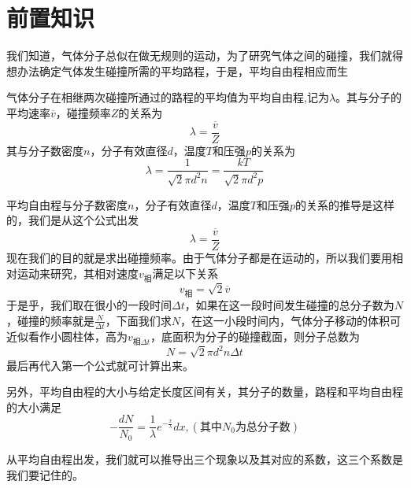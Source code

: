\documentclass[lang=cn,10pt]{elegantbook}
\begin{document}
	\section{前置知识}
	我们知道，气体分子总似在做无规则的运动，为了研究气体之间的碰撞，我们就得想办法确定气体发生碰撞所需的平均路程，于是，平均自由程相应而生
    \begin{definition}[平均自由程]
    	气体分子在相继两次碰撞所通过的路程的平均值为平均自由程,记为$\lambda$。其与分子的平均速率$\overline{v}$，碰撞频率$Z$的关系为
    	\begin{equation*}
    		\lambda=\frac{\overline{v}}{Z}
    	\end{equation*}
    	其与分子数密度$n$，分子有效直径$d$，温度$T$和压强$p$的关系为
    	\begin{equation*}
    		\lambda=\frac{1}{\sqrt{2}\pi d^{2}n}=\frac{kT}{\sqrt{2}\pi d^{2}p}
    	\end{equation*}
    \end{definition}
    \begin{note}
    	平均自由程与分子数密度$n$，分子有效直径$d$，温度$T$和压强$p$的关系的推导是这样的，我们是从这个公式出发
    	\begin{equation*}
    		\lambda=\frac{\overline{v}}{Z}
    	\end{equation*}
    	现在我们的目的就是求出碰撞频率。由于气体分子都是在运动的，所以我们要用相对运动来研究，其相对速度$v_{\text{相}}$满足以下关系
    	\begin{equation*}
    		v_{\text{相}}=\sqrt{2}\overline{v}
    	\end{equation*}
    	于是乎，我们取在很小的一段时间$\varDelta t$，如果在这一段时间发生碰撞的总分子数为$N$，碰撞的频率就是$\frac{N}{\varDelta t}$，下面我们求$N$，在这一小段时间内，气体分子移动的体积可近似看作小圆柱体，高为$v_{\text{相}\varDelta t}$，底面积为分子的碰撞截面，则分子总数为
    	\begin{equation*}
    		N=\sqrt{2}\pi d^{2}n \varDelta t
    	\end{equation*}
    	最后再代入第一个公式就可计算出来。
    \end{note}
    另外，平均自由程的大小与给定长度区间有关，其分子的数量，路程和平均自由程的大小满足
    \begin{equation*}
    	-\frac{dN}{N_0}=\frac{1}{\lambda}e^{-\frac{x}{\lambda}}dx,(\text{其中}N_{0}\text{为总分子数})
    \end{equation*}
    
    从平均自由程出发，我们就可以推导出三个现象以及其对应的系数，这三个系数是我们要记住的。
    
\end{document}
